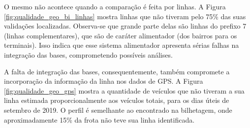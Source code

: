 \documentclass[        
    a4paper,          %
    12pt,             %
    chapter=TITLE,    %
    section=Title,    %
    subsection=Title, %
    oneside,          %
    english,          %
    spanish,          %
    brazil,           %
    fleqn             %
]{abntex2}
\begin{document}
  O mesmo não acontece quando a comparação é feita por linhas. A Figura \ref{fig:qualidade_geo_bi_linhas} mostra linhas que não tiveram pelo 75\% das suas validações localizadas. Observa-se que grande parte delas são linhas do prefixo 7 (linhas complementares), que são de caráter alimentador (dos bairros para os terminais). Isso indica que esse sistema alimentador apresenta sérias falhas na integração das bases, comprometendo possíveis análises.
  
  \begin{figure}[!h]
  \captionsetup{width=16cm}
  \centering
  \end{figure}
  
  A falta de integração das bases, consequentemente, também compromete a incorporação da informação da linha nos dados de GPS. A Figura \ref{fig:qualidade_geo_gps} mostra a quantidade de veículos que não tiveram a sua linha estimada proporcionalmente aos veículos totais, para os dias úteis de setembro de 2019. O perfil é semelhante ao encontrado na bilhetagem, onde aproximadamente 15\% da frota não teve sua linha identificada.
  
\end{document}

